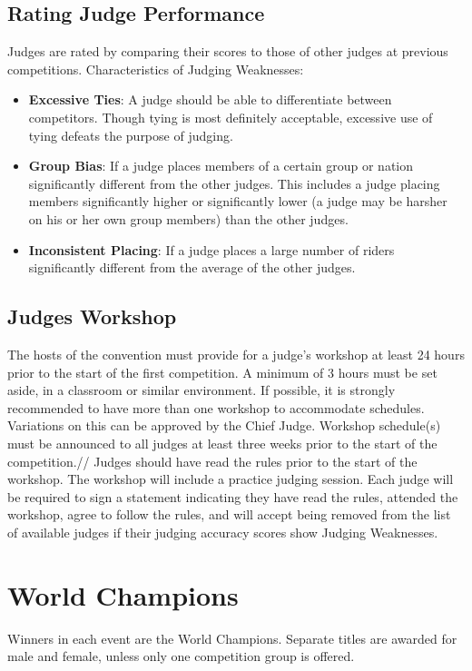 \subsection{Rating Judge Performance}
Judges are rated by comparing their scores to those of other judges at previous competitions. Characteristics of Judging
Weaknesses:\\
\begin{itemize}
\item \textbf{Excessive Ties}: A judge should be able to differentiate between competitors. Though tying is most definitely
acceptable, excessive use of tying defeats the purpose of judging.\\
\item \textbf{Group Bias}: If a judge places members of a certain group or nation significantly different from the other judges. This includes a judge placing members significantly higher or significantly lower (a judge may be harsher on his or her own group members) than the other judges.\\
\item\textbf{Inconsistent Placing}: If a judge places a large number of riders significantly different from the average of the other judges.
\end{itemize}

\subsection{Judges Workshop}
The hosts of the convention must provide for a judge’s workshop at least 24 hours prior to the start of the first competition. A minimum of 3 hours must be set aside, in a classroom or similar environment. If possible, it is strongly recommended to have more than one workshop to accommodate schedules. Variations on this can be approved by the Chief Judge. Workshop schedule(s) must be announced to all judges at least three weeks prior to the start of the competition.//
Judges should have read the rules prior to the start of the workshop. The workshop will include a practice judging session. Each judge will be required to sign a statement indicating they have read the rules, attended the workshop, agree to follow the rules, and will accept being removed from the list of available judges if their judging accuracy scores show Judging Weaknesses.

\section{World Champions}
Winners in each event are the World Champions. Separate titles are awarded for male and female, unless only one competition group is offered.

